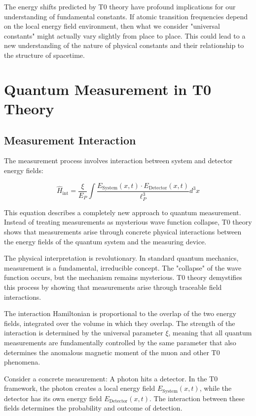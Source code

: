 \documentclass[12pt,a4paper]{article}
\newcommand{\xipar}{\xi}
\newcommand{\EPlanck}{E_P}
\theoremstyle{definition}
\theoremstyle{remark}
\begin{document}
The energy shifts predicted by T0 theory have profound implications for our understanding of fundamental constants. If atomic transition frequencies depend on the local energy field environment, then what we consider "universal constants" might actually vary slightly from place to place. This could lead to a new understanding of the nature of physical constants and their relationship to the structure of spacetime.

\section{Quantum Measurement in T0 Theory}

\subsection{Measurement Interaction}

The measurement process involves interaction between system and detector energy fields:

\begin{equation}
	\hat{H}_{\text{int}} = \frac{\xipar}{\EPlanck} \int \frac{E_{\text{System}}(x,t) \cdot E_{\text{Detector}}(x,t)}{\ell_P^3} d^3x
	\label{eq:measurement_interaction}
\end{equation}

This equation describes a completely new approach to quantum measurement. Instead of treating measurements as mysterious wave function collapse, T0 theory shows that measurements arise through concrete physical interactions between the energy fields of the quantum system and the measuring device.

The physical interpretation is revolutionary. In standard quantum mechanics, measurement is a fundamental, irreducible concept. The "collapse" of the wave function occurs, but the mechanism remains mysterious. T0 theory demystifies this process by showing that measurements arise through traceable field interactions.

The interaction Hamiltonian is proportional to the overlap of the two energy fields, integrated over the volume in which they overlap. The strength of the interaction is determined by the universal parameter $\xipar$, meaning that all quantum measurements are fundamentally controlled by the same parameter that also determines the anomalous magnetic moment of the muon and other T0 phenomena.

Consider a concrete measurement: A photon hits a detector. In the T0 framework, the photon creates a local energy field $E_{\text{System}}(x,t)$, while the detector has its own energy field $E_{\text{Detector}}(x,t)$. The interaction between these fields determines the probability and outcome of detection.
\end{document}

